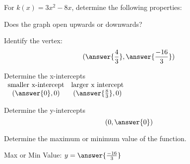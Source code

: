 \documentclass{ximera}
\author{David Kish}
\begin{document}
For $k(x) = 3x^2-8x$, determine the following properties:
\begin{exercise}
Does the graph open upwards or downwards?
\begin{multipleChoice}
\end{multipleChoice}
\end{exercise}
\begin{exercise}
Identify the vertex:
\[
(\answer{\frac{4}{3}},\answer{\frac{-16}{3}})
\]
\end{exercise}
\begin{exercise}
Determine the x-intercepts\\
$
\begin{array}{cc}
\text{smaller x-intercept} & \text{larger x intercept}\\
(\answer{0},0) & (\answer{\frac{8}{3}},0)
\end{array}
$
\end{exercise}
\begin{exercise}
Determine the y-intercepts
\[
(0,\answer{0})
\]
\end{exercise}
\begin{exercise}
Determine the maximum or minimum value of the function.
\begin{multipleChoice}
\end{multipleChoice}
Max or Min Value: $y = \answer{\frac{-16}{3}}$
\end{exercise}
\end{document}
